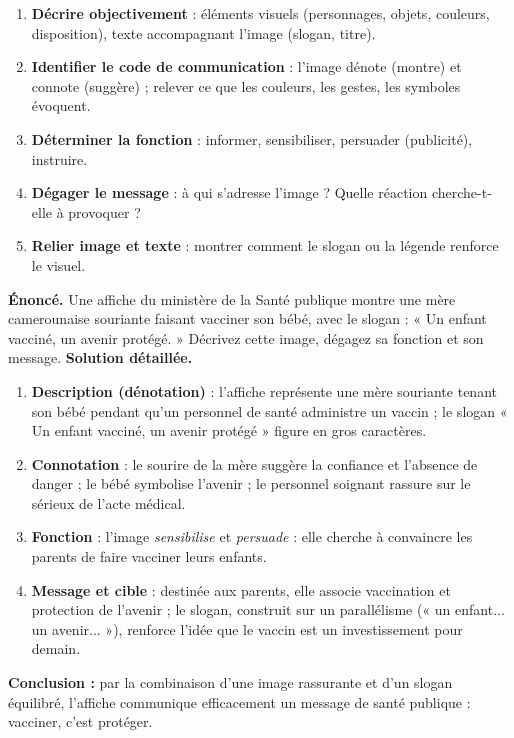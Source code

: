\documentclass[11pt]{article}
\newcommand{\cle}[1]{{\popxbold\color{popdark}#1}}
\begin{document}
\begin{methode}
\begin{enumerate}
\item \textbf{Décrire objectivement} : éléments visuels (personnages, objets, couleurs, disposition), texte accompagnant l'image (slogan, titre).
\item \textbf{Identifier le code de communication} : l'image \cle{dénote} (montre) et \cle{connote} (suggère) ; relever ce que les couleurs, les gestes, les symboles évoquent.
\item \textbf{Déterminer la fonction} : informer, sensibiliser, persuader (publicité), instruire.
\item \textbf{Dégager le message} : à qui s'adresse l'image ? Quelle réaction cherche-t-elle à provoquer ?
\item \textbf{Relier image et texte} : montrer comment le slogan ou la légende renforce le visuel.
\end{enumerate}
\end{methode}

\begin{exoresolu}
\textbf{Énoncé.} Une affiche du ministère de la Santé publique montre une mère camerounaise souriante faisant vacciner son bébé, avec le slogan : « Un enfant vacciné, un avenir protégé. » Décrivez cette image, dégagez sa fonction et son message.
\tcblower
\textbf{Solution détaillée.}
\begin{enumerate}
\item \textbf{Description (dénotation)} : l'affiche représente une mère souriante tenant son bébé pendant qu'un personnel de santé administre un vaccin ; le slogan « Un enfant vacciné, un avenir protégé » figure en gros caractères.
\item \textbf{Connotation} : le sourire de la mère suggère la confiance et l'absence de danger ; le bébé symbolise l'avenir ; le personnel soignant rassure sur le sérieux de l'acte médical.
\item \textbf{Fonction} : l'image \emph{sensibilise} et \emph{persuade} : elle cherche à convaincre les parents de faire vacciner leurs enfants.
\item \textbf{Message et cible} : destinée aux parents, elle associe vaccination et protection de l'avenir ; le slogan, construit sur un parallélisme (« un enfant... un avenir... »), renforce l'idée que le vaccin est un investissement pour demain.
\end{enumerate}
\textbf{Conclusion :} par la combinaison d'une image rassurante et d'un slogan équilibré, l'affiche communique efficacement un message de santé publique : vacciner, c'est protéger.
\end{exoresolu}
\end{document}
